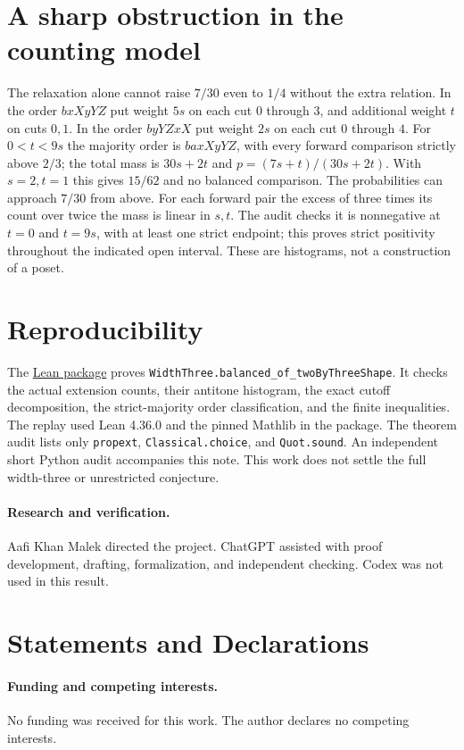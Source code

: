 \documentclass[11pt]{article}
\newcommand{\repo}{https://github.com/Aafimalek/novel-discoveries/tree/research/parallel-foundations/width-three-posets}
\begin{document}
\section{A sharp obstruction in the counting model}
The relaxation alone cannot raise $7/30$ even to $1/4$ without
the extra relation. In the order $bxXyYZ$ put weight $5s$ on each
cut $0$ through $3$, and additional weight $t$ on cuts $0,1$.
In the order $byYZxX$ put weight $2s$ on each cut $0$ through $4$.
For $0<t<9s$ the majority order is $baxXyYZ$, with every forward
comparison strictly above $2/3$; the total mass is $30s+2t$ and
$p=(7s+t)/(30s+2t)$. With $s=2,t=1$ this gives $15/62$ and
no balanced comparison. The probabilities can approach $7/30$
from above. For each forward pair the excess of three times its count
over twice the mass is linear in $s,t$. The audit checks it is
nonnegative at $t=0$ and $t=9s$, with at least one strict endpoint;
this proves strict positivity throughout the indicated open interval.
These are histograms, not a construction of a poset.

\section{Reproducibility}
The \href{\repo/verification/two-by-three-balanced}{Lean package}
proves \texttt{WidthThree.balanced\_of\_twoByThreeShape}. It checks
the actual extension counts, their antitone histogram, the exact
cutoff decomposition, the strict-majority order classification,
and the finite inequalities. The replay used Lean 4.36.0 and the
pinned Mathlib in the package. The theorem audit lists only
\texttt{propext}, \texttt{Classical.choice}, and \texttt{Quot.sound}.
An independent short Python audit accompanies this note.
This work does not settle the full width-three or unrestricted conjecture.

\paragraph{Research and verification.}
Aafi Khan Malek directed the project. ChatGPT assisted with
proof development, drafting, formalization, and independent checking.
Codex was not used in this result.

\section*{Statements and Declarations}
\paragraph{Funding and competing interests.}
No funding was received for this work. The author declares no competing
interests.
\end{document}
